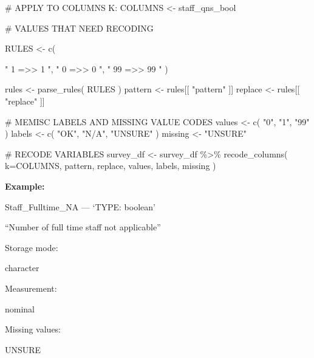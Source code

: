 \documentclass[
  letterpaper,
]{scrbook}
\newenvironment{Shaded}{\begin{snugshade}}{\end{snugshade}}
\newcommand{\AttributeTok}[1]{\textcolor[rgb]{0.40,0.45,0.13}{#1}}
\newcommand{\CommentTok}[1]{\textcolor[rgb]{0.37,0.37,0.37}{#1}}
\newcommand{\FunctionTok}[1]{\textcolor[rgb]{0.28,0.35,0.67}{#1}}
\newcommand{\NormalTok}[1]{\textcolor[rgb]{0.00,0.23,0.31}{#1}}
\newcommand{\OtherTok}[1]{\textcolor[rgb]{0.00,0.23,0.31}{#1}}
\newcommand{\SpecialCharTok}[1]{\textcolor[rgb]{0.37,0.37,0.37}{#1}}
\newcommand{\StringTok}[1]{\textcolor[rgb]{0.13,0.47,0.30}{#1}}
\begin{document}
\begin{Shaded}
\begin{Highlighting}[]
\CommentTok{\# APPLY TO COLUMNS K:}
\NormalTok{COLUMNS }\OtherTok{\textless{}{-}}\NormalTok{  staff\_qns\_bool}

\CommentTok{\# VALUES THAT NEED RECODING}

\NormalTok{RULES }\OtherTok{\textless{}{-}} \FunctionTok{c}\NormalTok{(    }
          
             \StringTok{"    1    =\textgreater{}\textgreater{}      1    "}\NormalTok{, }
             \StringTok{"    0    =\textgreater{}\textgreater{}      0    "}\NormalTok{, }
             \StringTok{"   99    =\textgreater{}\textgreater{}     99    "}\NormalTok{     )}


\NormalTok{rules }\OtherTok{\textless{}{-}} \FunctionTok{parse\_rules}\NormalTok{( RULES )          }
\NormalTok{pattern }\OtherTok{\textless{}{-}}\NormalTok{ rules[[ }\StringTok{"pattern"}\NormalTok{ ]]}
\NormalTok{replace }\OtherTok{\textless{}{-}}\NormalTok{ rules[[ }\StringTok{"replace"}\NormalTok{ ]]}

\CommentTok{\# MEMISC LABELS AND MISSING VALUE CODES }
\NormalTok{values  }\OtherTok{\textless{}{-}} \FunctionTok{c}\NormalTok{( }\StringTok{"0"}\NormalTok{, }\StringTok{"1"}\NormalTok{, }\StringTok{"99"}\NormalTok{ )}
\NormalTok{labels  }\OtherTok{\textless{}{-}} \FunctionTok{c}\NormalTok{( }\StringTok{"OK"}\NormalTok{, }\StringTok{"N/A"}\NormalTok{, }\StringTok{"UNSURE"}\NormalTok{ )}
\NormalTok{missing }\OtherTok{\textless{}{-}} \StringTok{"UNSURE"}

\CommentTok{\# RECODE VARIABLES }
\NormalTok{survey\_df }\OtherTok{\textless{}{-}} 
\NormalTok{  survey\_df }\SpecialCharTok{\%\textgreater{}\%} 
  \FunctionTok{recode\_columns}\NormalTok{( }\AttributeTok{k=}\NormalTok{COLUMNS, pattern, replace, values, labels, missing )}
\end{Highlighting}
\end{Shaded}

\textbf{Example:}

Staff\_Fulltime\_NA --- {`TYPE: boolean'}

``Number of full time staff not applicable''

Storage mode:

character

Measurement:

nominal

Missing values:

UNSURE
\end{document}
